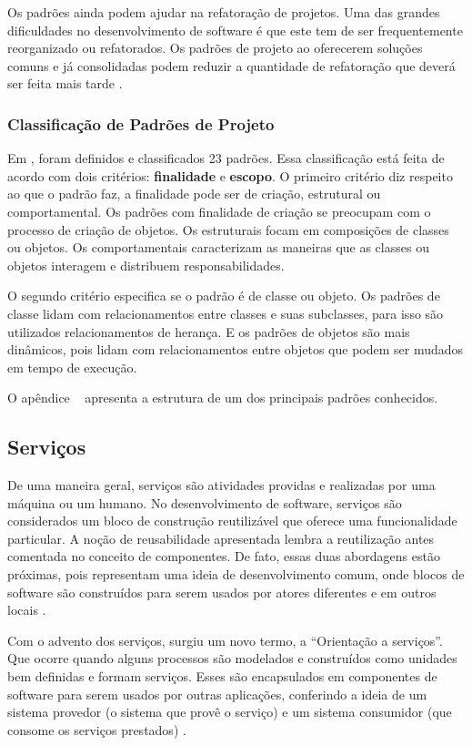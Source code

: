 Os padrões ainda podem ajudar na refatoração de projetos. Uma das grandes dificuldades no desenvolvimento de software é que este tem de ser frequentemente reorganizado ou refatorados. Os padrões de projeto ao oferecerem soluções comuns e já consolidadas podem reduzir a quantidade de refatoração que deverá ser feita mais tarde \cite{Gamma:1995}.

\subsubsection{Classificação de Padrões de Projeto}

Em \cite{Gamma:1995}, foram definidos e classificados 23 padrões. Essa classificação está feita de acordo com dois critérios: \textbf{finalidade} e \textbf{escopo}. O primeiro critério diz respeito ao que o padrão faz, a finalidade pode ser de criação, estrutural ou comportamental. Os padrões com finalidade de criação se preocupam com o processo de criação de objetos. Os estruturais focam em composições de classes ou objetos. Os comportamentais caracterizam as maneiras que as classes ou objetos interagem e distribuem responsabilidades.

O segundo critério especifica se o padrão é de classe ou objeto. Os padrões de classe lidam com relacionamentos entre classes e suas subclasses, para isso são utilizados relacionamentos de herança. E os padrões de objetos são mais dinâmicos, pois lidam com relacionamentos entre objetos que podem ser mudados em tempo de execução.

O apêndice ~ apresenta a estrutura de um dos principais padrões conhecidos.

\subsection{Serviços}

De uma maneira geral, serviços são atividades providas e realizadas por uma máquina ou um humano. No desenvolvimento de software, serviços são considerados um bloco de construção reutilizável que oferece uma funcionalidade particular. A noção de reusabilidade apresentada lembra a reutilização antes comentada no conceito de componentes. De fato, essas duas abordagens estão próximas, pois representam uma ideia de desenvolvimento comum, onde blocos de software são construídos para serem usados por atores diferentes e em outros locais \cite{Stojanovic:Dahanayake:2005}.

Com o advento dos serviços, surgiu um novo termo, a ``Orientação a serviços''. Que ocorre quando alguns processos são modelados e construídos como unidades bem definidas e formam serviços. Esses são encapsulados em componentes de software para serem usados por outras aplicações, conferindo a ideia de um sistema provedor (o sistema que provê o serviço) e um sistema consumidor (que consome os serviços prestados) \cite{Victorino:Brascher:2009}.

